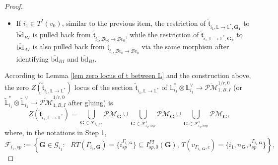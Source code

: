 \documentclass[11pt]{amsart}
\theoremstyle{definition}
\theoremstyle{remark}
\newcommand{\oPMb}{{\overline{\mathcal{PM}}}}
\newcommand{\<}{\left<}
\renewcommand{\>}{\right>}
\numberwithin{equation}{section}
\begin{document}
\begin{proof}
\begin{itemize}
        
      

        \item[-] If $i_1\in T^I(v_{0})$, similar to the previous item, the restriction of $\tilde{\mathfrak{t}}_{i_1,\mathbb L \to \mathbb L^*,\mathbf{G_1}}$ to $\overline{\text{bd}}_{BI}$ is pulled back from  $\tilde{\mathfrak t}_{i_1,{\mathcal B}v_{0}\to\hat{\mathcal B}v_{0}}$, 
         while the restriction of $\tilde{\mathfrak{t}}_{i_1,\mathbb L \to \mathbb L^*,\mathbf{G_2}}$ to $\overline{\text{bd}}_{AI}$  is also pulled back 
         from $\tilde{\mathfrak t}_{i_1,{\mathcal B}v_0\to\hat{\mathcal B}v_0}$ via the same morphism after identifying $\overline{\text{bd}}_{BI}$ and $\overline{\text{bd}}_{BI}$.

        \end{itemize}

        According to Lemma \ref{lem zero locus of t between L} and the construction above, the zero $Z(\tilde{\mathfrak{t}}_{i_1,\mathbb L \to \mathbb L^*})$ locus of the section $\tilde{\mathfrak{t}}_{i_1,\mathbb L \to \mathbb L^*}$ of  ${\mathbb L}^*_{i_1}\otimes {\mathbb L}_{i_1}^\vee\to  \oPMb^{1/r,0}_{1,B,I}$ (or $\widetilde{\mathbb L}^*_{i_1}\otimes \widetilde{\mathbb L}_{i_1}^\vee \to \widetilde{\mathcal{PM}}^{1/r,0}_{1,B,I}$ after gluing) is 
        \begin{equation*}
        Z(\tilde{\mathfrak{t}}_{i_1,\mathbb L \to \mathbb L^*})=\bigcup_{\mathbf{G}\in \bm{\mathcal F}_{i_1,sp}} \oPMb_{\mathbf{G}} \cup \bigcup_{\mathbf{G}\in \bm{\mathcal F}^1_{i_1,nsp}} \oPMb_{\mathbf{G}} \cup \bigcup_{\mathbf{G}\in\bm{\mathcal F}^2_{i_1,nsp}} \oPMb_{\mathbf{G}},
        \end{equation*}
        where, in the notations in Step %
1, 
        \begin{equation*}
            \bm{\mathcal F}_{i_1,sp}:=\left\{ \bm{G}\in \bm{\mathcal G}_{i_1} \colon \text{ $RT(\Gamma_{i_1,\bm{G}})=\{i^{\Gamma_{i_1,\bm{G}}}_{sp}\}\subseteq I^{PI}_{sp,0}(\bm{G})$, $T(v_{\Gamma_{i_1,\bm{G}},c})=\{i_1,n_{\bm{G}},i^{\Gamma_{i_1,\bm{G}}}_{sp}\}$}\right \},
        \end{equation*}

\end{proof}
\end{document}
